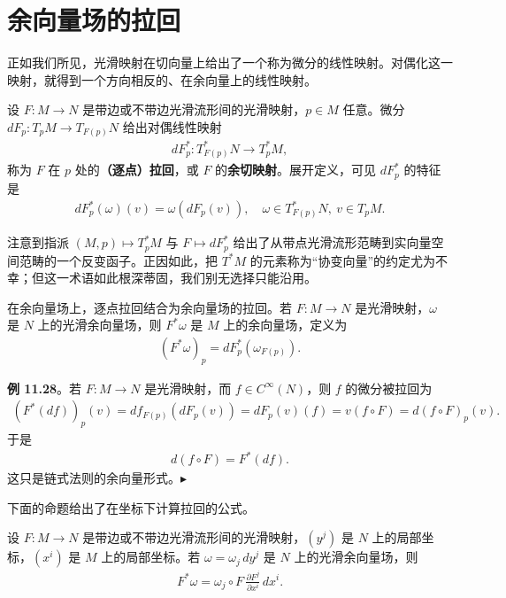 \documentclass[../../main.tex]{subfiles}
\begin{document}
\section{余向量场的拉回}\label{section:ch11-余向量场的拉回}

正如我们所见，光滑映射在切向量上给出了一个称为微分的线性映射。对偶化这一映射，就得到一个方向相反的、在余向量上的线性映射。

设 $F\colon M\to N$ 是带边或不带边光滑流形间的光滑映射，$p\in M$ 任意。微分 $dF_p\colon T_pM\to T_{F(p)}N$ 给出对偶线性映射
\begin{align*}
dF_p^*\colon T_{F(p)}^*N\to T_p^*M,
\end{align*}
称为 $F$ 在 $p$ 处的\textbf{（逐点）拉回}，或 $F$ 的\textbf{余切映射}。展开定义，可见 $dF_p^*$ 的特征是
\begin{align}
dF_p^*(\omega)(v)=\omega(dF_p(v)),\quad \omega\in T_{F(p)}^*N,\ v\in T_pM.\label{align:ch11-逐点拉回}
\end{align}

注意到指派 $(M,p)\mapsto T_p^*M$ 与 $F\mapsto dF_p^*$ 给出了从带点光滑流形范畴到实向量空间范畴的一个反变函子。正因如此，把 $T^*M$ 的元素称为“协变向量”的约定尤为不幸；但这一术语如此根深蒂固，我们别无选择只能沿用。

在余向量场上，逐点拉回结合为余向量场的拉回。若 $F\colon M\to N$ 是光滑映射，$\omega$ 是 $N$ 上的光滑余向量场，则 $F^*\omega$ 是 $M$ 上的余向量场，定义为
\begin{align}
(F^*\omega)_p=dF_p^*(\omega_{F(p)}).\label{align:ch11-余向量场拉回2}
\end{align}

\textbf{例 11.28}。若 $F\colon M\to N$ 是光滑映射，而 $f\in C^\infty(N)$，则 $f$ 的微分被拉回为
\begin{align*}
(F^*(df))_p(v)=df_{F(p)}(dF_p(v))=dF_p(v)(f)=v(f\circ F)=d(f\circ F)_p(v).
\end{align*}
于是
\begin{align}
d(f\circ F)=F^*(df).\label{align:ch11-链法则微分}
\end{align}
这只是链式法则的余向量形式。$\blacktriangleright$

下面的命题给出了在坐标下计算拉回的公式。

\begin{proposition}[拉回的坐标公式]\label{proposition:ch11-拉回坐标公式}
设 $F\colon M\to N$ 是带边或不带边光滑流形间的光滑映射，$(y^j)$ 是 $N$ 上的局部坐标，$(x^i)$ 是 $M$ 上的局部坐标。若 $\omega=\omega_j\,dy^j$ 是 $N$ 上的光滑余向量场，则
\begin{align}
F^*\omega=\omega_j\circ F\,\frac{\partial F^j}{\partial x^i}\,dx^i.\label{align:ch11-拉回坐标公式}
\end{align}
\end{proposition}
\end{document}
